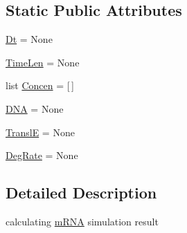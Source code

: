 \subsection*{Static Public Attributes}
\begin{DoxyCompactItemize}
\item 
\hyperlink{classweb_1_1_simulate___class_1_1m_r_n_a___simulate_aff71f631c32c2e13789fb4f2e413feb5}{Dt} = None
\item 
\hyperlink{classweb_1_1_simulate___class_1_1m_r_n_a___simulate_a1fbca90fe65ec4c5a6e07ef6aab4ef4f}{Time\-Len} = None
\item 
list \hyperlink{classweb_1_1_simulate___class_1_1m_r_n_a___simulate_a8d08b83d4273c7c21c20fedc33d71d46}{Concen} = \mbox{[}$\,$\mbox{]}
\item 
\hyperlink{classweb_1_1_simulate___class_1_1m_r_n_a___simulate_a93f85081905b6beb3c395793f15b2956}{D\-N\-A} = None
\item 
\hyperlink{classweb_1_1_simulate___class_1_1m_r_n_a___simulate_a0f1d34dcecf981a5dac457ce57260ead}{Transl\-E} = None
\item 
\hyperlink{classweb_1_1_simulate___class_1_1m_r_n_a___simulate_ab0f22fbf0ee72dcac2743805b982aab8}{Deg\-Rate} = None
\end{DoxyCompactItemize}


\subsection{Detailed Description}
calculating \hyperlink{classm_r_n_a}{m\-R\-N\-A} simulation result 



 

